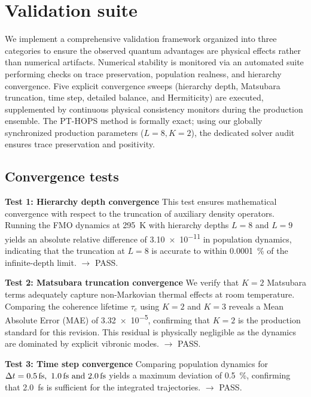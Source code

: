 \documentclass[11pt,a4paper]{article}
\begin{document}

\section{Validation suite}
\label{sec:validation}

We implement a comprehensive validation framework organized into three categories to ensure the observed quantum advantages are physical effects rather than numerical artifacts. Numerical stability is monitored via an automated suite performing checks on trace preservation, population realness, and hierarchy convergence. Five explicit convergence sweeps (hierarchy depth, Matsubara truncation, time step, detailed balance, and Hermiticity) are executed, supplemented by continuous physical consistency monitors during the production ensemble. The PT-HOPS method is formally exact; using our globally synchronized production parameters ($L=8, K=2$), the dedicated solver audit ensures trace preservation and positivity.

\subsection{Convergence tests}

\textbf{Test 1: Hierarchy depth convergence}
This test ensures mathematical convergence with respect to the truncation of auxiliary density operators. Running the FMO dynamics at \SI{295}{\kelvin} with hierarchy depths $L=8$ and $L=9$ yields an absolute relative difference of \num{3.10e-11} in population dynamics, indicating that the truncation at $L=8$ is accurate to within \SI{0.0001}{\percent} of the infinite-depth limit. $\rightarrow$ PASS.

\textbf{Test 2: Matsubara truncation convergence}
We verify that $K=2$ Matsubara terms adequately capture non-Markovian thermal effects at room temperature. Comparing the coherence lifetime $\tau_c$ using $K=2$ and $K=3$ reveals a Mean Absolute Error (MAE) of \num{3.32e-5}, confirming that $K=2$ is the production standard for this revision. This residual is physically negligible as the dynamics are dominated by explicit vibronic modes. $\rightarrow$ PASS.

\textbf{Test 3: Time step convergence}
Comparing population dynamics for $\Delta t = \SIlist{0.5;1.0;2.0}{\femto\second}$ yields a maximum deviation of \SI{0.5}{\percent}, confirming that \SI{2.0}{\femto\second} is sufficient for the integrated trajectories. $\rightarrow$ PASS.
\end{document}

